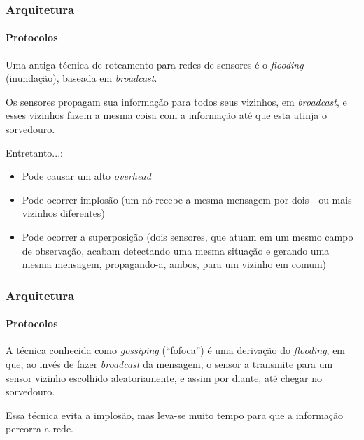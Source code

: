 \documentclass[notes]{beamer}
\begin{document}
\begin{frame}
\label{slide_45}
\frametitle{Arquitetura}
\framesubtitle{Protocolos}

\begin{block}

Uma antiga técnica de roteamento para redes de sensores é o \textit{flooding} (inundação), baseada em \textit{broadcast}. 

\end{block} \pause

\begin{block}

Os sensores propagam sua informação para todos seus vizinhos, em \textit{broadcast}, e esses vizinhos fazem a mesma coisa com a informação até que esta atinja o sorvedouro.

\end{block} \pause

\begin{alertblock}

Entretanto...: \pause

\begin{itemize}

\item Pode causar um alto \textit{overhead} \pause

\item Pode ocorrer implosão (um nó recebe a mesma mensagem por dois - ou mais - vizinhos diferentes) \pause

\item Pode ocorrer a superposição (dois sensores, que atuam em um mesmo campo de observação, acabam detectando uma mesma situação e gerando uma mesma mensagem, propagando-a, ambos, para um vizinho em comum)

\end{itemize}

\end{alertblock}

\end{frame}

\begin{frame}
\label{slide_46}
\frametitle{Arquitetura}
\framesubtitle{Protocolos}

\begin{block}

A técnica conhecida como \textit{gossiping} (“fofoca”) é uma derivação do \textit{flooding}, em que, ao invés de fazer \textit{broadcast} da mensagem, o sensor a transmite para um sensor vizinho escolhido aleatoriamente, e assim por diante, até chegar no sorvedouro.

\end{block} \pause

\begin{alertblock}

Essa técnica evita a implosão, mas leva-se muito tempo para que a informação percorra a rede.  

\end{alertblock}

\end{frame}
\end{document}
